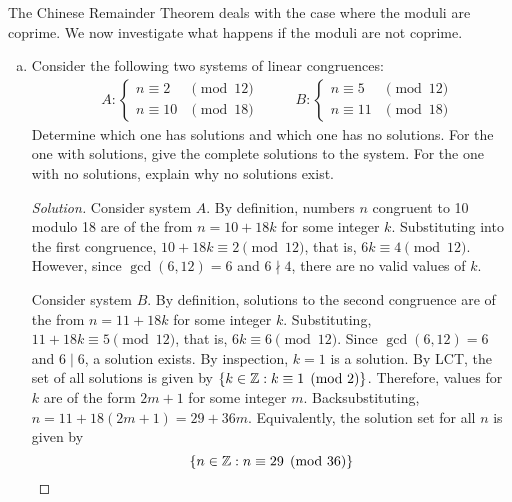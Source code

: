 \documentclass{agony}
\begin{document}
\question The Chinese Remainder Theorem deals with the case where the moduli are coprime.
We now investigate what happens if the moduli are not coprime.
\begin{enumerate}[(a)]
  \item Consider the following two systems of linear congruences:
        \begin{align*}
           & A : \begin{cases}
            n \equiv 2  & \pmod{12} \\
            n \equiv 10 & \pmod{18}
          \end{cases}
           & \quad                          &
          B : \begin{cases}
            n \equiv 5  & \pmod{12} \\
            n \equiv 11 & \pmod{18}
          \end{cases}
        \end{align*}
        Determine which one has solutions and which one has no solutions.
        For the one with solutions, give the complete solutions to the system.
        For the one with no solutions, explain why no solutions exist.
        \begin{proof}[Solution]
          Consider system $A$.
          By definition, numbers $n$ congruent to 10 modulo 18 are of the from
          $n = 10 + 18k$ for some integer $k$.
          Substituting into the first congruence,
          $10 + 18k \equiv 2 \pmod{12}$, that is, $6k \equiv 4 \pmod{12}$.
          However, since $\gcd(6,12)=6$ and $6 \nmid 4$, there are no valid values of $k$.

          Consider system $B$.
          By definition, solutions to the second congruence are of the from
          $n = 11 + 18k$ for some integer $k$.
          Substituting, $11 + 18k \equiv 5 \pmod{12}$, that is, $6k \equiv 6 \pmod{12}$.
          Since $\gcd(6,12) = 6$ and $6 \mid 6$, a solution exists.
          By inspection, $k=1$ is a solution.
          By LCT, the set of all solutions is given by $\{ k \in \mathbb{Z} : k \equiv 1 \pmod{2} \}$.
          Therefore, values for $k$ are of the form $2m+1$ for some integer $m$.
          Backsubstituting, $n = 11 + 18(2m+1) = 29 + 36m$.
          Equivalently, the solution set for all $n$ is given by
          \[ \{ n\in\mathbb{Z} : n \equiv 29 \pmod{36} \} \qedhere \]
        \end{proof}


\end{enumerate}
\end{document}

